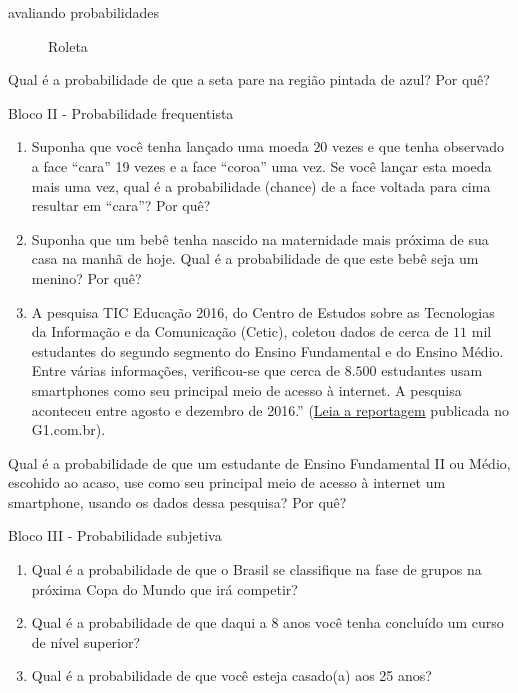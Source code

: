 \begin{task}{avaliando probabilidades}
\begin{enumerate}
\begin{figure}[H]
\begin{tikzpicture}[scale=.75]
\end{tikzpicture}
\caption{Roleta}
\label{roleta}
\end{figure}


\end{enumerate}

Qual é a probabilidade de que a seta pare na região pintada de azul? Por quê?

Bloco II - Probabilidade frequentista
\begin{enumerate}
\item {} 
Suponha que você tenha lançado uma moeda $20$ vezes e que tenha observado a face “cara” 19 vezes e a face “coroa” uma vez. Se você lançar esta moeda mais uma vez, qual é a probabilidade (chance) de a face voltada para cima resultar em “cara”? Por quê?

\item {} 
Suponha que um bebê tenha nascido na maternidade mais próxima de sua casa na manhã de hoje. Qual é a probabilidade de que este bebê seja um menino? Por quê?

\item {} 
A pesquisa TIC Educação 2016, do Centro de Estudos sobre as Tecnologias da Informação e da Comunicação (Cetic), coletou dados de cerca de $11$ mil estudantes do segundo segmento do Ensino Fundamental e do Ensino Médio. Entre várias informações, verificou-se que cerca de $8.500$ estudantes usam smartphones como seu principal meio de acesso à internet. A pesquisa aconteceu entre agosto e dezembro de 2016.” (\href{https://g1.globo.com/educacao/noticia/52-das-instituicoes-de-educacao-basica-usam-celular-em-atividades-escolares-aponta-estudo-da-cetic.ghtml}{Leia a reportagem} publicada no G1.com.br).

\end{enumerate}

Qual é a probabilidade de que um estudante de Ensino Fundamental II ou Médio, escohido ao acaso, use como seu principal meio de acesso à internet um smartphone, usando os dados dessa pesquisa? Por quê?

Bloco III - Probabilidade subjetiva
\begin{enumerate}
\item {} 
Qual é a probabilidade de que o Brasil se classifique na fase de grupos na próxima Copa do Mundo que irá competir?

\item {} 
Qual é a probabilidade de que daqui a 8 anos você tenha concluído um curso de nível superior?

\item {} 
Qual é a probabilidade de que você esteja casado(a) aos 25 anos?

\end{enumerate}
\end{task}


